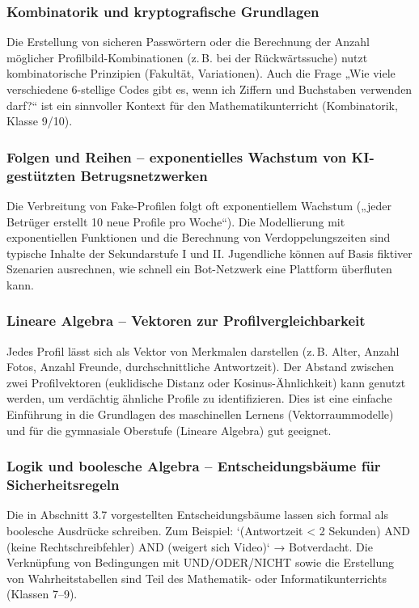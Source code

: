 \documentclass[12pt,a4paper,oneside]{scrartcl}
\begin{document}
	\subsubsection{Kombinatorik und kryptografische Grundlagen}
	
	Die Erstellung von sicheren Passwörtern oder die Berechnung der Anzahl möglicher Profilbild-Kombinationen (z.\,B. bei der Rückwärtssuche) nutzt kombinatorische Prinzipien (Fakultät, Variationen). Auch die Frage „Wie viele verschiedene 6-stellige Codes gibt es, wenn ich Ziffern und Buchstaben verwenden darf?“ ist ein sinnvoller Kontext für den Mathematikunterricht (Kombinatorik, Klasse 9/10).
	
	\subsubsection{Folgen und Reihen – exponentielles Wachstum von KI-gestützten Betrugsnetzwerken}
	
	Die Verbreitung von Fake-Profilen folgt oft exponentiellem Wachstum („jeder Betrüger erstellt 10 neue Profile pro Woche“). Die Modellierung mit exponentiellen Funktionen und die Berechnung von Verdoppelungszeiten sind typische Inhalte der Sekundarstufe I und II. Jugendliche können auf Basis fiktiver Szenarien ausrechnen, wie schnell ein Bot-Netzwerk eine Plattform überfluten kann.
	
	\subsubsection{Lineare Algebra – Vektoren zur Profilvergleichbarkeit}
	
	Jedes Profil lässt sich als Vektor von Merkmalen darstellen (z.\,B. Alter, Anzahl Fotos, Anzahl Freunde, durchschnittliche Antwortzeit). Der Abstand zwischen zwei Profilvektoren (euklidische Distanz oder Kosinus-Ähnlichkeit) kann genutzt werden, um verdächtig ähnliche Profile zu identifizieren. Dies ist eine einfache Einführung in die Grundlagen des maschinellen Lernens (Vektorraummodelle) und für die gymnasiale Oberstufe (Lineare Algebra) gut geeignet.
	
	\subsubsection{Logik und boolesche Algebra – Entscheidungsbäume für Sicherheitsregeln}
	
	Die in Abschnitt 3.7 vorgestellten Entscheidungsbäume lassen sich formal als boolesche Ausdrücke schreiben. Zum Beispiel: `(Antwortzeit < 2 Sekunden) AND (keine Rechtschreibfehler) AND (weigert sich Video)` → Botverdacht. Die Verknüpfung von Bedingungen mit UND/ODER/NICHT sowie die Erstellung von Wahrheitstabellen sind Teil des Mathematik- oder Informatikunterrichts (Klassen 7–9).
	
\end{document}
